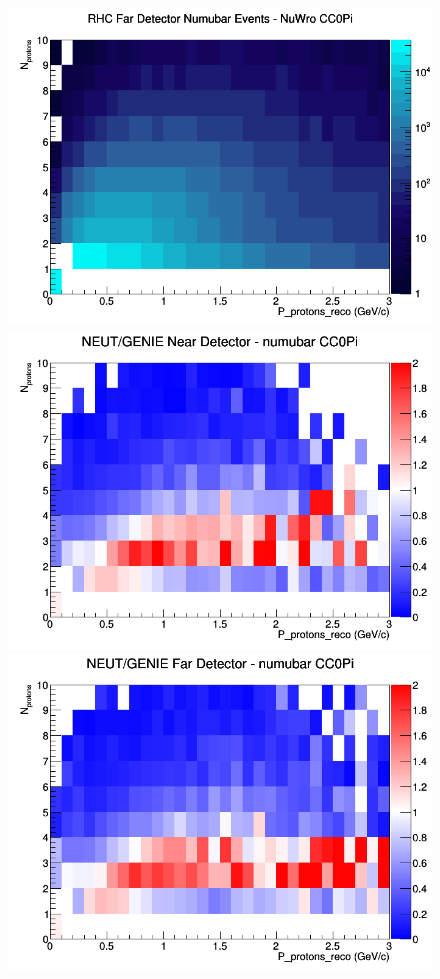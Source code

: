 \begin{figure}[h]
\endminipage
{}
\includegraphics[width=\linewidth]{eff_N_P/LAr/protons/CC0Pi_RHC_FD_numubar_N_P_NuWro.png}
\endminipage
\newline
{}
\includegraphics[width=\linewidth]{eff_N_P/LAr/protons/ratios/CC0Pi_NEUT_GENIE_numubar_near_N_P.png}
\endminipage
{}
\includegraphics[width=\linewidth]{eff_N_P/LAr/protons/ratios/CC0Pi_NEUT_GENIE_numubar_far_N_P.png}

\end{figure}
